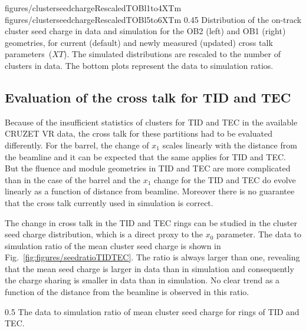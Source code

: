                  {figures/clusterseedchargeRescaledTOBl1to4XTm} %
                 {figures/clusterseedchargeRescaledTOBl5to6XTm} %
                 {0.45}       %
                 { Distribution of the on-track cluster seed charge in data and simulation for the OB2 (left) and OB1 (right) geometries, for current (default) and newly measured (updated) cross talk parameters~($XT$).  The simulated distributions are rescaled to the number of clusters in data.  The bottom plots represent the data to simulation ratios. }


\subsection{Evaluation of the cross talk for TID and TEC~\label{sec:tuning}}



Because of the insufficient statistics of clusters for TID and TEC in the available CRUZET VR data, the cross talk for these partitions had to be evaluated differently. For the barrel, the change of $x_{1}$ scales linearly with the distance from the beamline and it can be expected that the same applies for TID and TEC. But the fluence and module geometries in TID and TEC are more complicated than in the case of the barrel and the $x_{1}$ change for the TID and TEC do evolve linearly as a function of distance from beamline. Moreover there is no guarantee that the cross talk currently used in simulation is correct.  

The change in cross talk in the TID and TEC rings can be studied in the cluster seed charge distribution, which is a direct proxy to the $x_{0}$ parameter. The data to simulation ratio of the mean cluster seed charge is shown in Fig.~\ref{fig:figures/seedratioTIDTEC}. The ratio is always larger than one, revealing that the mean seed charge is larger in data than in simulation and consequently the charge sharing is smaller in data than in simulation. No clear trend as a function of the distance from the beamline is observed in this ratio.

                 {0.5}       %
                 {The data to simulation ratio of mean cluster seed charge for rings of TID and TEC.}

